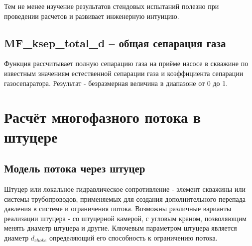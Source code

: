 Тем не менее изучение результатов стендовых испытаний полезно при проведении расчетов и развивает инженерную интуицию. 



\subsection{MF\_ksep\_total\_d – общая сепарация газа}

Функция рассчитывает полную сепарацию газа на приёме насосе в скважине по известным значениям естественной сепарации газа и коэффициента сепарации газосепаратора. Результат - безразмерная величина в диапазоне от 0 до 1. 


\section{Расчёт многофазного потока в штуцере}




\subsection{Модель потока через штуцер}


Штуцер или локальное гидравлическое сопротивление - элемент скважины или системы трубопроводов, применяемых для создания дополнительного перепада давления в системе и ограничения потока. 
Возможны различные варианты реализации штуцера - со штуцерной камерой, с угловым краном, позволяющим менять диаметр штуцера и другие.
Ключевым параметром штуцера является диаметр \(d_{choke} \) определяющий его способность к ограничению потока. 




